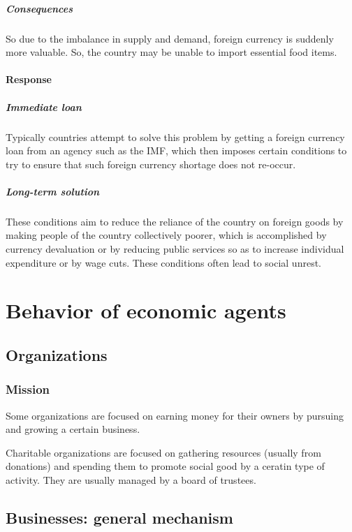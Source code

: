 \documentclass[oneside, article]{memoir}
\begin{document}
\subsubsection{Consequences}
So due to the imbalance in supply and demand, foreign currency is suddenly more valuable. So, the country may be unable to import essential food items.

\subsection{Response}
\subsubsection{Immediate loan}
Typically countries attempt to solve this problem by getting a foreign currency loan from an agency such as the IMF, which then imposes certain conditions to try to ensure that such foreign currency shortage does not re-occur.

\subsubsection{Long-term solution}
These conditions aim to reduce the reliance of the country on foreign goods by making people of the country collectively poorer, which is accomplished by currency devaluation or by reducing public services so as to increase individual expenditure or by wage cuts. These conditions often lead to social unrest.

\part{Behavior of economic agents}
\chapter{Organizations}
\section{Mission}
Some organizations are focused on earning money for their owners by pursuing and growing a certain business.

Charitable organizations are focused on gathering resources (usually from donations) and spending them to promote social good by a ceratin type of activity. They are usually managed by a board of trustees.

\chapter{Businesses: general mechanism}
\end{document}
